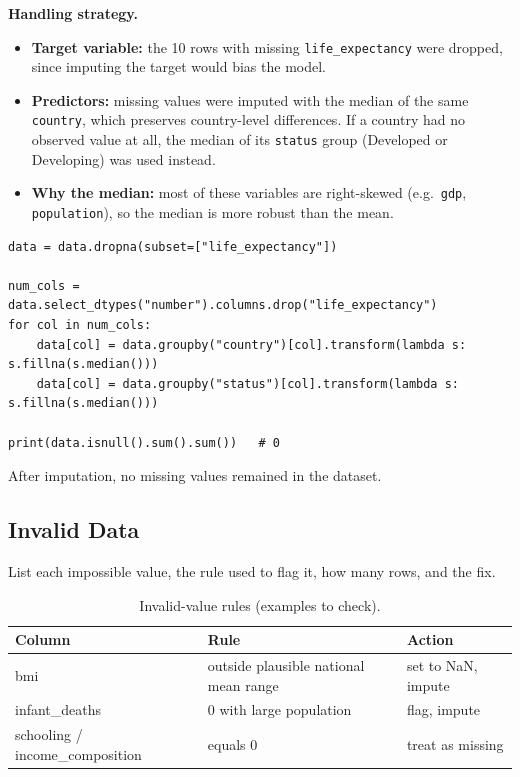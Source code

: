 \documentclass[12pt,a4paper]{article}
\begin{document}
\textbf{Handling strategy.}
\begin{itemize}
  \item \textbf{Target variable:} the 10 rows with missing
        \texttt{life\_expectancy} were dropped, since imputing the target would
        bias the model.
  \item \textbf{Predictors:} missing values were imputed with the median of the
        same \texttt{country}, which preserves country-level differences.
        If a country had no observed value at all, the median of its
        \texttt{status} group (Developed or Developing) was used instead.
  \item \textbf{Why the median:} most of these variables are right-skewed
        (e.g.\ \texttt{gdp}, \texttt{population}), so the median is more robust than the mean.
\end{itemize}

\begin{lstlisting}
data = data.dropna(subset=["life_expectancy"])

num_cols = data.select_dtypes("number").columns.drop("life_expectancy")
for col in num_cols:
    data[col] = data.groupby("country")[col].transform(lambda s: s.fillna(s.median()))
    data[col] = data.groupby("status")[col].transform(lambda s: s.fillna(s.median()))

print(data.isnull().sum().sum())   # 0
\end{lstlisting}
After imputation, no missing values remained in the dataset.

\subsection{Invalid Data}\label{sec:invalid}
List each impossible value, the rule used to flag it, how many rows, and the fix.
\begin{table}[H]\centering\caption{Invalid-value rules (examples to check).}
\begin{tabularx}{\textwidth}{llX}\toprule
\textbf{Column} & \textbf{Rule} & \textbf{Action}\\\midrule
bmi & outside plausible national mean range & set to NaN, impute\\
infant\_deaths & 0 with large population & flag, impute\\
schooling / income\_composition & equals 0 & treat as missing\\\bottomrule
\end{tabularx}\end{table}
\end{document}

